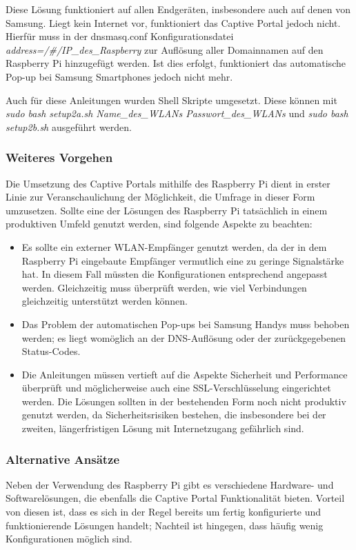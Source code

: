 Diese Lösung funktioniert auf allen Endgeräten, insbesondere auch auf denen von Samsung. Liegt kein Internet vor, funktioniert das Captive Portal jedoch nicht. Hierfür muss in der dnsmasq.conf Konfigurationsdatei \textit{address=/\#/IP\_des\_Raspberry} zur Auflösung aller Domainnamen auf den Raspberry Pi hinzugefügt werden. Ist dies erfolgt, funktioniert das automatische Pop-up bei Samsung Smartphones jedoch nicht mehr.

Auch für diese Anleitungen wurden Shell Skripte umgesetzt. Diese können mit \textit{sudo bash setup2a.sh Name\_des\_WLANs Passwort\_des\_WLANs} und \textit{sudo bash setup2b.sh} ausgeführt werden.

\subsubsection*{Weiteres Vorgehen}
Die Umsetzung des Captive Portals mithilfe des Raspberry Pi dient in erster Linie zur Veranschaulichung der Möglichkeit, die Umfrage in dieser Form umzusetzen. Sollte eine der Lösungen des Raspberry Pi tatsächlich in einem produktiven Umfeld genutzt werden, sind folgende Aspekte zu beachten:
\begin{itemize}
\item Es sollte ein externer WLAN-Empfänger genutzt werden, da der in dem Raspberry Pi eingebaute Empfänger vermutlich eine zu geringe Signalstärke hat. In diesem Fall müssten die Konfigurationen entsprechend angepasst werden. Gleichzeitig muss überprüft werden, wie viel Verbindungen gleichzeitig unterstützt werden können.
\item Das Problem der automatischen Pop-ups bei Samsung Handys muss behoben werden; es liegt womöglich an der DNS-Auflösung oder der zurückgegebenen Status-Codes.
\item Die Anleitungen müssen vertieft auf die Aspekte Sicherheit und Performance überprüft und möglicherweise auch eine SSL-Verschlüsselung eingerichtet werden. Die Lösungen sollten in der bestehenden Form noch nicht produktiv genutzt werden, da Sicherheitsrisiken bestehen, die insbesondere bei der zweiten, längerfristigen Lösung mit Internetzugang gefährlich sind.

\end{itemize}

\subsubsection{Alternative Ansätze}
Neben der Verwendung des Raspberry Pi gibt es verschiedene Hardware- und Softwarelösungen, die ebenfalls die Captive Portal Funktionalität bieten. Vorteil von diesen ist, dass es sich in der Regel bereits um fertig konfigurierte und funktionierende Lösungen handelt; Nachteil ist hingegen, dass häufig wenig Konfigurationen möglich sind.

